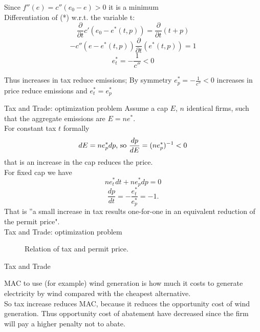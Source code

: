 	 Since $f''(e)=c''(e_0-e)>0$ it is a minimum \\

	 Differentiation of (*) w.r.t. the variable t:
\[
\frac{\partial}{\partial{t}}c'(e_0-e^*(t,p))=\frac{\partial}{\partial{t}}(t+p)
\]
\[
-c''(e-e^*(t,p)) \frac{\partial}{\partial{t}} (e^*(t,p))=1
\]
\[
e^*_t=-\frac{1}{c''} < 0
\]

	 Thus increases in tax reduce emissions; By symmetry $e^*_p = -\frac{1}{c''} < 0$ increases in price reduce emissions and $e^*_t=e^*_p$



{Tax and Trade: optimization problem}
Assume a cap $E$, $n$ identical firms, such that the aggregate emissions are $E=ne^*$. \\
For constant tax $t$ formally
\[
dE = ne^*_pdp \textnormal{, so } \frac{dp}{dE} = (ne^*_p)^{-1} < 0
\]
that is an increase in the cap reduces the price. \\
For fixed cap we have
\[
ne^*_tdt+ne^*_pdp=0
\]
\[
\frac{dp}{dt}=-\frac{e^*_t}{e^*_p}=-1.
\]
That is ''a small increase in tax results one-for-one in an equivalent reduction of the permit price". \\


{Tax and Trade: optimization problem}
\begin{center}
\begin{figure}[h!]
\centering
{}
\caption{Relation of tax and permit price.}
\end{figure}
\end{center}


{Tax and Trade}


	 MAC to use (for example) wind generation is how much it costs to generate electricity by wind compared with the cheapest alternative. \\

	 So tax increase reduces MAC, because it reduces the opportunity cost of wind generation. Thus opportunity cost of abatement have decreased since the firm will pay a higher penalty not to abate.

